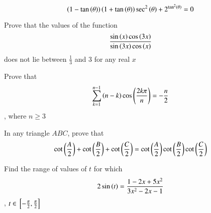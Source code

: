 $$
\left(1-\tan \left(\theta\right)\right)\left(1+\tan \left(\theta\right)\right)\sec^2\left(\theta\right)+ 2^{\tan^2\left(\theta\right)}=0
$$
\hfill{}
\item Prove that the values of the function 
$$
\frac{\sin \left(x\right) \cos \left(3x\right)}{\sin \left(3x\right) \cos \left(x\right)}
$$
does not lie between $\frac{1}{3}$ and $3$ for any real $x$\\
\hfill{}
\item Prove that 
$$
\sum_{k=1}^{n-1} \left(n-k\right)\cos\left( \frac{2k\pi}{n}\right)=-\frac{n}{2}
$$
, where $n\ge3$
\hfill{}
\item In any triangle $ABC$, prove that 
$$
\cot \left(\frac{A}{2}\right)+\cot \left(\frac{B}{2}\right)+\cot \left(\frac{C}{2}\right)=\cot \left(\frac{A}{2}\right)\cot \left(\frac{B}{2}\right)\cot \left(\frac{C}{2}\right)
$$
\hfill{}
\item Find the range of values of $t$ for which 
$$
2\sin \left(t\right) = \frac{1-2x+5x^2}{3x^2-2x-1}
$$
, $t \in {}\left[-\frac{\pi}{2},\frac{\pi}{2}\right]$
\hfill{}
